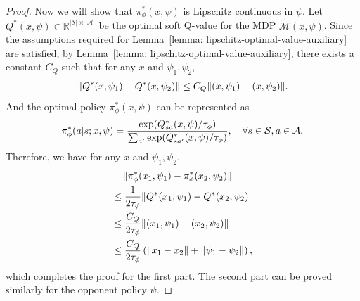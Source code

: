 \documentclass{article}
\theoremstyle{plain}
\theoremstyle{definition}
\theoremstyle{remark}
\def\R{\mathbb R}
\def\cA{\mathcal A}
\def\cM{\mathcal M}
\def\cS{\mathcal S}
\begin{document}
\begin{proof}
    Now we will show that $\pi_\phi^*(x,\psi)$ is Lipschitz continuous in $\psi$. Let $Q^*(x,\psi) \in \R^{|\cS|\times|\cA|}$ be the optimal soft Q-value for the MDP $\widetilde{\cM}(x,\psi)$. Since the assumptions required for Lemma~\ref{lemma: lipschitz-optimal-value-auxiliary} are satisfied, by Lemma~\ref{lemma: lipschitz-optimal-value-auxiliary}, there exists a constant $C_Q$ such that for any $x$ and $\psi_1,\psi_2$,
    \begin{align}
        \| Q^*(x,\psi_1) - Q^*(x,\psi_2) \| \leq C_Q \| (x,\psi_1) - (x,\psi_2) \|. \notag
    \end{align}
    And the optimal policy $\pi_\phi^*(x,\psi)$ can be represented as
    \begin{align}
        \pi_\phi^*(a|s;x,\psi) = \frac{\exp(Q^*_{sa}(x,\psi)/\tau_\phi)}{\sum_{a^\prime} \exp(Q^*_{sa^\prime}(x,\psi)/\tau_\phi)}, \quad \forall s\in\cS, a\in\cA. \notag
    \end{align}
    Therefore, we have for any $x$ and $\psi_1,\psi_2$,
    \begin{align}
        & \quad \, \| \pi_\phi^*(x_1,\psi_1) - \pi_\phi^*(x_2,\psi_2) \| \notag \\
        & \leq \frac{1}{2\tau_\phi} \| Q^*(x_1,\psi_1) - Q^*(x_2,\psi_2) \| \notag \\
        & \leq \frac{C_Q}{2\tau_\phi} \| (x_1, \psi_1) - (x_2,\psi_2) \| \notag\\
        & \leq \frac{C_Q}{2\tau_\phi} \left( \| x_1 - x_2 \| + \| \psi_1 - \psi_2 \| \right),
    \end{align}
    which completes the proof for the first part.
    The second part can be proved similarly for the opponent policy $\psi$.
\end{proof}
\end{document}
